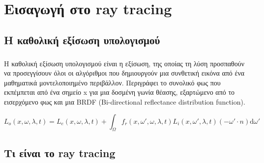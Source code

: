 \chapter{Εισαγωγή στο ray tracing}

\begin{sloppypar}

\section{H καθολική εξίσωση υπολογισμού}

\paragraph{}
	Η καθολική εξίσωση υπολογισμού είναι η εξίσωση, της οποίας τη λύση προσπαθούν να προσεγγίσουν όλοι οι αλγόριθμοι
που δημιουργούν μια συνθετική εικόνα από ένα μαθηματικά μοντελοποιημένο περιβάλλον. Περιγράφει το συνολικό
φως που εκπέμπεται από ένα σημείο x για μια δοσμένη γωνία θέασης, εξαρτώμενο από το εισερχόμενο φως και μια
BRDF (Bi-directional reflectance distribution function).

\begin{equation}
L_o(x, ω, λ, t) = L_e(x, ω, λ, t) + \int_Ω \! f_r(x, ω', ω, λ, t) L_i(x, ω', λ, t)(-ω' \cdot n) \mathrm{d}ω'
\end{equation}

\paragraph{}

\section{Τι είναι το ray tracing}

\end{sloppypar}
